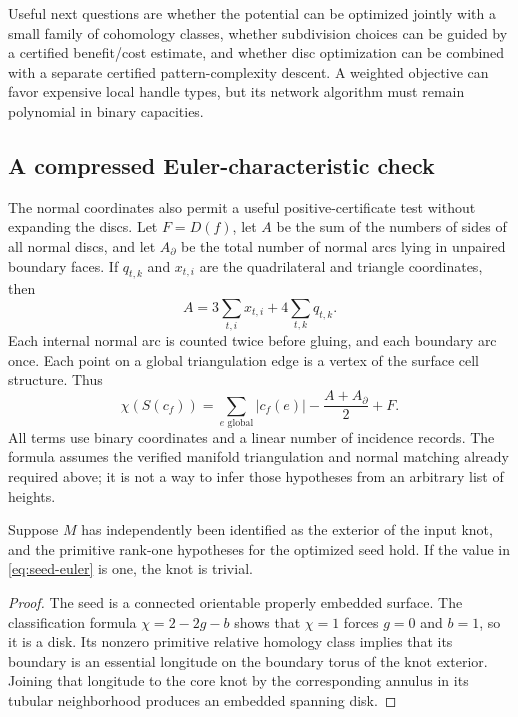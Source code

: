 Useful next questions are whether the potential can be optimized jointly
with a small family of cohomology classes, whether subdivision choices
can be guided by a certified benefit/cost estimate, and whether disc
optimization can be combined with a separate certified pattern-complexity
descent. A weighted objective can favor expensive local handle types, but
its network algorithm must remain polynomial in binary capacities.

\subsection{A compressed Euler-characteristic check}

The normal coordinates also permit a useful positive-certificate test without
expanding the discs. Let $F=D(f)$, let $A$ be the sum of the numbers of sides
of all normal discs, and let $A_{\partial}$ be the total number of normal
arcs lying in unpaired boundary faces. If $q_{t,k}$ and $x_{t,i}$ are the
quadrilateral and triangle coordinates, then
\[
 A=3\sum_{t,i}x_{t,i}+4\sum_{t,k}q_{t,k}.
\]
Each internal normal arc is counted twice before gluing, and each boundary
arc once. Each point on a global triangulation edge is a vertex of the
surface cell structure. Thus
\begin{equation}
 \chi(S(c_f))=
 \sum_{e\text{ global}}|c_f(e)|
 -\frac{A+A_{\partial}}{2}+F.
 \label{eq:seed-euler}
\end{equation}
All terms use binary coordinates and a linear number of incidence records.
The formula assumes the verified manifold triangulation and normal matching
already required above; it is not a way to infer those hypotheses from an
arbitrary list of heights.

\begin{proposition}
Suppose $M$ has independently been identified as the exterior of the input
knot, and the primitive rank-one hypotheses for the optimized seed hold.
If the value in \eqref{eq:seed-euler} is one, the knot is trivial.
\end{proposition}
\begin{proof}
The seed is a connected orientable properly embedded surface. The
classification formula $\chi=2-2g-b$ shows that $\chi=1$ forces $g=0$ and
$b=1$, so it is a disk. Its nonzero primitive relative homology class implies
that its boundary is an essential longitude on the boundary torus of the
knot exterior. Joining that longitude to the core knot by the corresponding
annulus in its tubular neighborhood produces an embedded spanning disk.
\end{proof}

